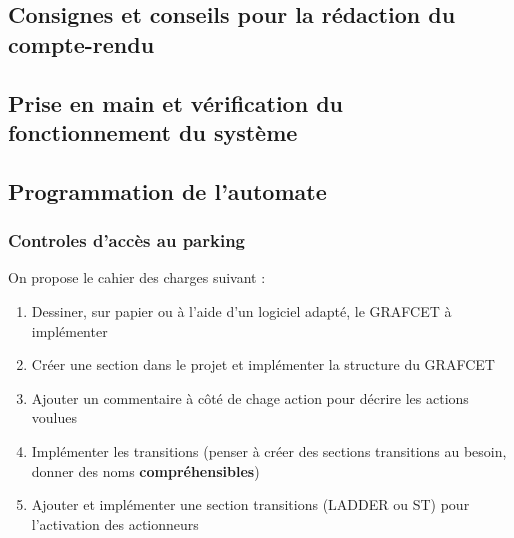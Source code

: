 \documentclass[11pt, multicol]{article}
\begin{document}
\subsection{Consignes et conseils pour la rédaction du compte-rendu}

\subsection{Prise en main et vérification du fonctionnement du système}


\subsection{Programmation de l'automate}
\subsubsection{Controles d'accès au parking}
On propose le cahier des charges suivant :

\begin{UPSTIactivite}
	\label{act:barriereEntree}
	\begin{enumerate}
		\item Dessiner, sur papier ou à l'aide d'un logiciel adapté, le GRAFCET à implémenter
		\item Créer une section dans le projet et implémenter la structure du GRAFCET
		\item Ajouter un commentaire à côté de chage action pour décrire les actions voulues
		\item Implémenter les transitions (penser à créer des sections transitions au besoin, donner des noms \textbf{compréhensibles})
		\item Ajouter et implémenter une section transitions (LADDER ou ST) pour l'activation des actionneurs
	\end{enumerate}
\end{UPSTIactivite}
\end{document}
